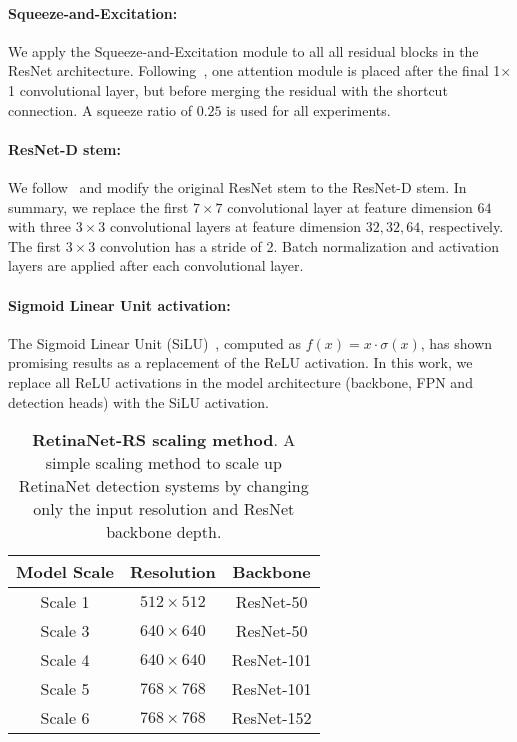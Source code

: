 \documentclass[final]{cvpr}
\begin{document}
\paragraph{\bf Squeeze-and-Excitation:} We apply the Squeeze-and-Excitation module to all  all residual blocks in the ResNet architecture. Following~\cite{senet}, one attention module is placed after the final 1$\times$1 convolutional layer, but before merging the residual with the shortcut connection. A squeeze ratio of $0.25$ is used for all experiments. 

\paragraph{\bf ResNet-D stem:} We follow~\cite{inceptionv2,bagoftricks} and modify the original ResNet stem to the ResNet-D stem. In summary, we replace the first $7\times7$ convolutional layer at feature dimension $64$ with three $3\times3$ convolutional layers at feature dimension $32, 32, 64$, respectively. The first $3\times3$ convolution has a stride of 2. Batch normalization and activation layers are applied after each convolutional layer.

\paragraph{\bf Sigmoid Linear Unit activation:} The Sigmoid Linear Unit (SiLU)~\cite{GELU}, computed as $f(x)=x\cdot \sigma(x)$, has shown promising results as a replacement of the ReLU activation. In this work, we replace all ReLU activations in the model architecture (backbone, FPN and detection heads) with the SiLU activation.


\setlength{\tabcolsep}{4pt}
\begin{table}[b]
\begin{center}{
\begin{tabular}{c | c c}
\toprule
 Model Scale & Resolution & Backbone\\
 \midrule
Scale 1 & $512\times512$ & ResNet-50 \\
Scale 3 & $640\times640$ & ResNet-50 \\
Scale 4 & $640\times640$ & ResNet-101 \\
Scale 5 & $768\times768$ & ResNet-101 \\
Scale 6 & $768\times768$ & ResNet-152 \\
\bottomrule
\end{tabular}
}
\end{center}
\caption{\textbf{RetinaNet-RS scaling method}. A simple scaling method to scale up RetinaNet detection systems by changing only the input resolution and ResNet backbone depth.}
\label{tab:scaling_ret}
\vspace{-0mm}
\end{table}
\end{document}

